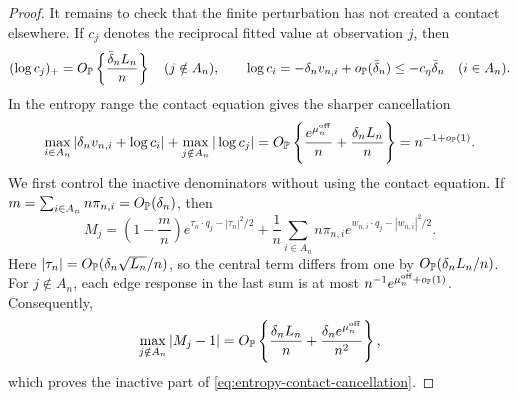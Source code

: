 \begin{proof}
It remains to check that the finite perturbation has not created a contact
elsewhere.  If \(c_j\) denotes the reciprocal fitted value at observation
\(j\), then
\begin{equation}
\label{eq:below-simplex-weight-perturbation}
 (\log c_j)_+
 =
 O_{\mathbb P}\left\{\frac{\bar\delta_nL_n}{n}\right\}
 \quad(j\notin A_n),
 \qquad
 \log c_i=-\delta_nv_{n,i}+o_{\mathbb P}(\bar\delta_n)
 \le-c_\eta\bar\delta_n
 \quad(i\in A_n).
\end{equation}
In the entropy range the contact equation gives the sharper cancellation
\begin{equation}
\label{eq:entropy-contact-cancellation}
 \max_{i\in A_n}
 \left|\delta_nv_{n,i}+\log c_i\right|
 +\max_{j\notin A_n}|\log c_j|
 =
 O_{\mathbb P}\left\{
  \frac{e^{\mu_n^{\rm off}}}n+\frac{\delta_nL_n}{n}
 \right\}
 =n^{-1+o_{\mathbb P}(1)}.
\end{equation}
We first control the inactive denominators without using the contact
equation.  If \(m=\sum_{i\in A_n}n\pi_{n,i}=O_{\mathbb P}(\delta_n)\), then
\[
 M_j
 =
 \left(1-\frac mn\right)
 e^{\tau_n\cdot q_j-|\tau_n|^2/2}
 +\frac1n\sum_{i\in A_n}n\pi_{n,i}
 e^{w_{n,i}\cdot q_j-|w_{n,i}|^2/2}.
\]
Here
\(|\tau_n|=O_{\mathbb P}(\delta_n\sqrt{L_n}/n)\), so the central term differs
from one by \(O_{\mathbb P}(\delta_nL_n/n)\).  For \(j\notin A_n\), each edge
response in the last sum is at most
\(n^{-1}e^{\mu_n^{\rm off}+o_{\mathbb P}(1)}\).  Consequently,
\[
 \max_{j\notin A_n}|M_j-1|
 =
 O_{\mathbb P}\left\{
  \frac{\delta_nL_n}{n}
  +\frac{\delta_ne^{\mu_n^{\rm off}}}{n^2}
 \right\},
\]
which proves the inactive part of
\eqref{eq:entropy-contact-cancellation}.


\end{proof}
